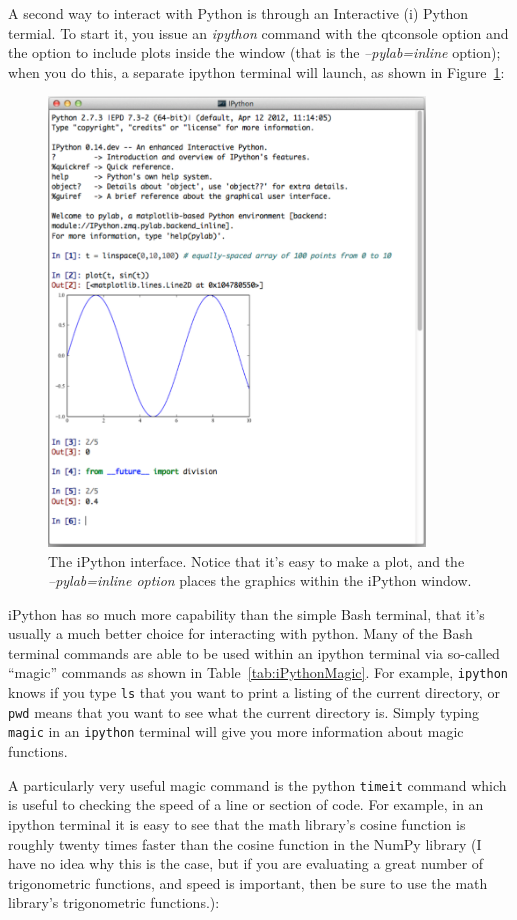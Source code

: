 A second way to interact with Python is through an Interactive (i) Python termial. To start it, you issue an \textit{ipython} 
command with the qtconsole option and the option to include plots inside the window (that is the \textit{--pylab=inline} option); when you do this, a separate ipython terminal will launch, as shown in Figure~\ref{fig:iPythonWindow}:
\begin{figure}[h]
	\centering
	\includegraphics[width=10cm]{Figures/BasicPython/iPythonWindow}
	\caption{The iPython interface. Notice that it's easy to make a plot, and the \textit{--pylab=inline option} places the graphics within the iPython window. }
	\label{fig:iPythonWindow}       %
\end{figure}

iPython has so much more capability than the simple Bash terminal, that it's usually a much better choice for interacting with python. Many of the Bash terminal commands are able to be used within an ipython terminal via so-called ``magic'' commands as shown in Table~\ref{tab:iPythonMagic}. For example, \texttt{ipython} knows if you type \texttt{ls} that you want to print a listing of the current directory, or \texttt{pwd} means that you want to see what the current directory is. Simply typing \texttt{magic} in an \texttt{ipython} terminal will give you more information about magic functions.  

A particularly very useful magic command is the python \texttt{timeit} command which is useful to checking the speed of a line or section of code. For example, in an ipython terminal it is easy to see that the math library's cosine function is  roughly twenty times faster than the cosine function in the NumPy library (I have no idea why this is the case, but if you are evaluating a great number of trigonometric functions, and speed is important, then be sure to use the math library's trigonometric functions.):


